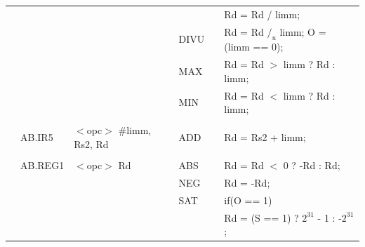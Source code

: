 \begin{table}
\begin{center}
\begin{tabular}{llllll}
                   &                   &                                       &                   &                   & Rd = Rd / limm;                                                               \\
                   &                   &                                       & DIVU              & \flags{!---}      & Rd = Rd $/_u$ limm; O = (limm == 0);                                          \\
                   &                   &                                       & MAX               & \flags{----}      & Rd = Rd $>$ limm ? Rd : limm;                                                 \\
                   &                   &                                       & MIN               & \flags{----}      & Rd = Rd $<$ limm ? Rd : limm;                                                 \\
                   &                   &                                       &                   &                   &                                                                               \\
                   & AB.IR5            & $<$opc$>$ \#limm, Rs2, Rd             & ADD               & \flags{****}      & Rd = Rs2 + limm;                                                              \\
                   &                   &                                       &                   &                   &                                                                               \\
                   & AB.REG1           & $<$opc$>$ Rd                          & ABS               & \flags{***-}      & Rd = Rd $<$ 0 ? -Rd : Rd;                                                     \\
                   &                   &                                       & NEG               & \flags{****}      & Rd = -Rd;                                                                     \\
                   &                   &                                       & SAT               & \flags{----}      & if(O == 1)                                                                    \\
                   &                   &                                       &                   &                   & \quad Rd = (S == 1) ? $2^{31}$ - 1 : -$2^{31}$;                               \\

\end{tabular}
\end{center}
\end{table}
